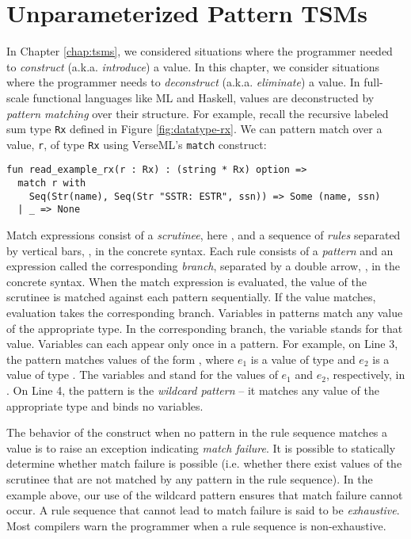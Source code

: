 \chapter{Unparameterized Pattern TSMs}\label{sec:pattern-tsms}
In Chapter \ref{chap:tsms}, we considered situations where the programmer needed to \emph{construct} (a.k.a. \emph{introduce}) a value. In this chapter, we consider situations where the programmer needs to \emph{deconstruct} (a.k.a. \emph{eliminate}) a value. In full-scale functional languages like ML and Haskell, values are deconstructed by \emph{pattern matching} over their structure. For example, recall the recursive labeled sum type \lstinline{Rx} defined in Figure \ref{fig:datatype-rx}. We can pattern match over a value, \lstinline{r}, of type \lstinline{Rx} using VerseML's \lstinline{match} construct:
\begin{lstlisting}
fun read_example_rx(r : Rx) : (string * Rx) option => 
  match r with 
    Seq(Str(name), Seq(Str "SSTR: ESTR", ssn)) => Some (name, ssn)
  | _ => None
\end{lstlisting}

Match expressions consist of a \emph{scrutinee}, here , and a sequence of \emph{rules} separated by vertical bars, \li{|}, in the concrete syntax. Each rule consists of a \emph{pattern} and an {expression} called the corresponding \emph{branch}, separated by a double arrow, \li{=>}, in the concrete syntax. When the {match} expression is evaluated, the value of the scrutinee is matched against each pattern sequentially. If the value matches, evaluation takes the corresponding branch. Variables in patterns match any value of the appropriate type. In the corresponding branch, the variable stands for that value. Variables can each appear only once in a pattern.  
For example, on Line 3, the pattern  matches values of the form , where $e_1$ is a value of type  and $e_2$ is a value of type . The variables  and  stand for the values of $e_1$ and $e_2$, respectively, in . On Line 4, the pattern \li{_} is the \emph{wildcard pattern} -- it matches any value of the appropriate type and binds no variables.

The behavior of the  construct when no pattern in the rule sequence matches a value is to raise an exception indicating \emph{match failure}. It is possible to statically determine whether match failure is possible (i.e. whether there exist values of the scrutinee that are not matched by any pattern in the rule sequence). In the example above, our use of the wildcard pattern ensures that match failure cannot occur. A rule sequence that cannot lead to match failure is said to be \emph{exhaustive}. Most compilers warn the programmer when a rule sequence is non-exhaustive.


